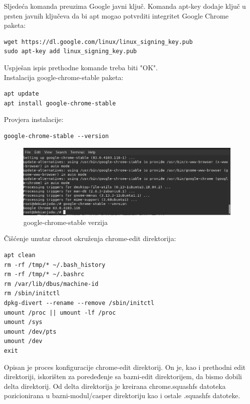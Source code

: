 \documentclass[12pt,vi]{mitthesis}
\begin{document}
\noindent
Sljedeća komanda preuzima Google javni ključ. Komanda apt-key dodaje ključ u prsten javnih ključeva da bi apt mogao potvrditi integritet Google Chrome paketa:\\
\begin{lstlisting}[style=BashInputStyle]
wget https://dl.google.com/linux/linux_signing_key.pub
sudo apt-key add linux_signing_key.pub
\end{lstlisting}
\noindent
Uspješan ispis prethodne komande treba biti "OK".\\
\noindent
Instalacija google-chrome-stable paketa:
\begin{lstlisting}[style=BashInputStyle]
apt update
apt install google-chrome-stable
\end{lstlisting}
\noindent
Provjera instalacije:
\begin{lstlisting}[style=BashInputStyle]
google-chrome-stable --version
\end{lstlisting}
\begin{figure}[!htb]
\centering
\includegraphics[width=\linewidth]{images/googlechromestableversion.png}
\caption{google-chrome-stable verzija}
\end{figure}
\noindent
Čišćenje unutar chroot okruženja chrome-edit direktorija:
\begin{lstlisting}[style=BashInputStyle]
apt clean
rm -rf /tmp/* ~/.bash_history
rm -rf /tmp/* ~/.bashrc
rm /var/lib/dbus/machine-id
rm /sbin/initctl
dpkg-divert --rename --remove /sbin/initctl
umount /proc || umount -lf /proc
umount /sys
umount /dev/pts
umount /dev
exit
\end{lstlisting}
\indent
Opisan je proces konfiguracije chrome-edit direktorij. On je, kao i prethodni edit direktoriji, iskorišten za poredeđenje sa bazni-edit direktorijem, da bismo dobili delta direktorij. Od delta direktorija je kreirana chrome.squashfs datoteka pozicionirana u bazni-modul/casper direktoriju kao i ostale .squashfs datoteke.
\end{document}
